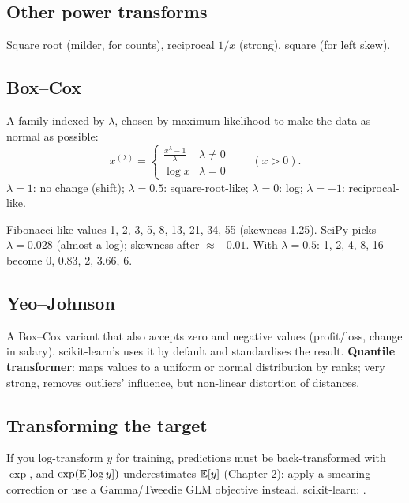 \subsection{Other power transforms}
Square root (milder, for counts), reciprocal $1/x$ (strong), square (for left skew).

\subsection{Box--Cox}
A family indexed by $\lambda$, chosen by maximum likelihood to make the data as normal as possible:
\[ x^{(\lambda)} = \begin{cases}\frac{x^\lambda - 1}{\lambda} & \lambda\ne0\\ \log x & \lambda = 0\end{cases}\qquad (x > 0). \]
$\lambda = 1$: no change (shift); $\lambda = 0.5$: square-root-like; $\lambda = 0$: log; $\lambda = -1$: reciprocal-like.
\begin{example}
Fibonacci-like values 1, 2, 3, 5, 8, 13, 21, 34, 55 (skewness 1.25). SciPy picks $\lambda = 0.028$ (almost a log); skewness after $\approx -0.01$.
With $\lambda = 0.5$: 1, 2, 4, 8, 16 become 0, 0.83, 2, 3.66, 6.
\end{example}

\subsection{Yeo--Johnson}
A Box--Cox variant that also accepts zero and negative values (profit/loss, change in salary). scikit-learn's  uses it by default and
standardises the result. \textbf{Quantile transformer}: maps values to a uniform or normal distribution by ranks; very strong, removes outliers' influence, but
non-linear distortion of distances.

\subsection{Transforming the target}
If you log-transform $y$ for training, predictions must be back-transformed with $\exp$, and $\exp(\mathbb{E}[\log y])$ underestimates $\mathbb{E}[y]$ (Chapter 2): apply a
smearing correction or use a Gamma/Tweedie GLM objective instead. scikit-learn: .

